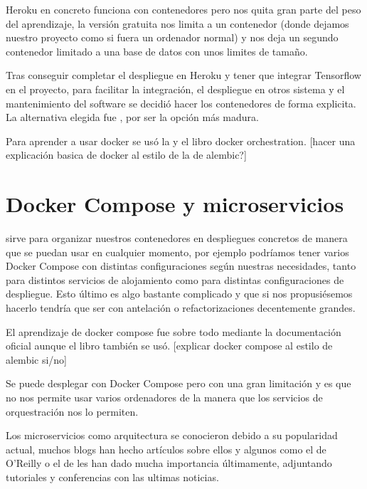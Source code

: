 Heroku en concreto funciona con contenedores pero nos quita gran parte del peso del aprendizaje, la versión gratuita nos limita a un contenedor (donde dejamos nuestro proyecto como si fuera un ordenador normal) y nos deja un segundo contenedor limitado a una base de datos  con unos limites de tamaño. 

Tras conseguir completar el despliegue en Heroku y tener que integrar Tensorflow en el proyecto, para facilitar la integración, el despliegue en otros sistema y el mantenimiento del software se decidió hacer los contenedores de forma explicita. La alternativa elegida fue , por ser la opción más madura. 

Para aprender a usar docker se usó la  y el libro docker orchestration\cite{ran17}. [hacer una explicación basica de docker al estilo de la de alembic?]

\section{Docker Compose y microservicios}

 sirve para organizar nuestros contenedores en despliegues concretos de manera que se puedan usar en cualquier momento, por ejemplo podríamos tener varios Docker Compose con distintas configuraciones según nuestras necesidades, tanto para distintos servicios de alojamiento como para distintas configuraciones de despliegue. Esto último es algo bastante complicado y que si nos propusiésemos hacerlo tendría que ser con antelación o refactorizaciones decentemente grandes.

El aprendizaje de docker compose fue sobre todo mediante la documentación oficial aunque el libro \cite{ran17} también se usó. [explicar docker compose al estilo de alembic si/no] 

Se puede desplegar con Docker Compose pero con una gran limitación y es que no nos permite usar varios ordenadores de la manera que los servicios de orquestración nos lo permiten.

Los microservicios como arquitectura se conocieron debido a su popularidad actual, muchos blogs han hecho artículos sobre ellos y algunos  como el de O'Reilly o el de  les han dado mucha importancia últimamente, adjuntando tutoriales y conferencias con las ultimas noticias.



